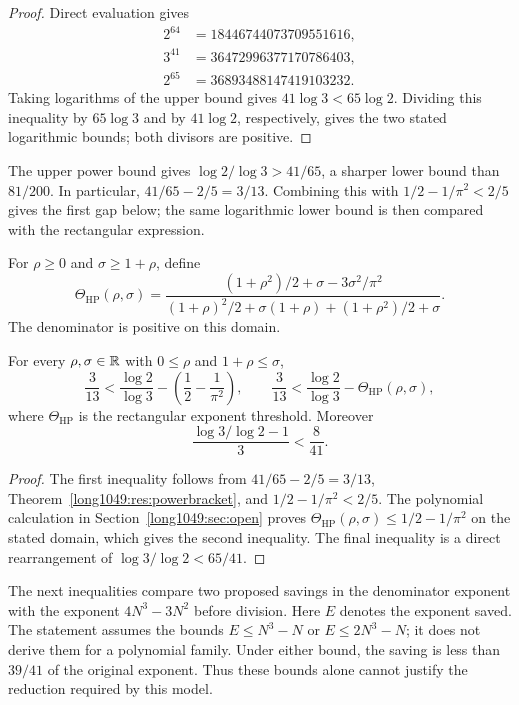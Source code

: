 \documentclass[11pt]{article}
\begin{document}
\begin{proof}
Direct evaluation gives
\[
 \begin{aligned}
 2^{64}&=18446744073709551616,\\
 3^{41}&=36472996377170786403,\\
 2^{65}&=36893488147419103232.
 \end{aligned}
\]
Taking logarithms of the upper bound gives $41\log3<65\log2$.
Dividing this inequality by $65\log3$ and by $41\log2$, respectively,
gives the two stated logarithmic bounds; both divisors are positive.
\end{proof}

The upper power bound gives $\log2/\log3>41/65$, a sharper lower
bound than $81/200$. In particular,
$41/65-2/5=3/13$. Combining this with
$1/2-1/\pi^2<2/5$ gives the first gap below; the same logarithmic
lower bound is then compared with the rectangular expression.

For $\rho\ge0$ and $\sigma\ge1+\rho$, define
\[
 \Theta_{\mathrm{HP}}(\rho,\sigma)=
 \frac{(1+\rho^2)/2+\sigma-3\sigma^2/\pi^2}
 {(1+\rho)^2/2+\sigma(1+\rho)+(1+\rho^2)/2+\sigma}.
\]
The denominator is positive on this domain.

\begin{corollary}\label{long1049:res:sharpgaps}
For every $\rho,\sigma\in\mathbb{R}$ with $0\le\rho$ and $1+\rho\le\sigma$,
\[
 \frac3{13}<\frac{\log2}{\log3}
   -\left(\frac12-\frac1{\pi^2}\right),
 \qquad
 \frac3{13}<\frac{\log2}{\log3}-\Theta_{\mathrm{HP}}(\rho,\sigma),
\]
where $\Theta_{\mathrm{HP}}$ is the rectangular exponent threshold.  Moreover
\[
 \frac{\log3/\log2-1}{3}<\frac8{41}.
\]
\end{corollary}

\begin{proof}
The first inequality follows from
$41/65-2/5=3/13$, Theorem~\ref{long1049:res:powerbracket}, and
$1/2-1/\pi^2<2/5$. The polynomial calculation in
Section~\ref{long1049:sec:open} proves
$\Theta_{\mathrm{HP}}(\rho,\sigma)\le1/2-1/\pi^2$ on the stated
domain, which gives the second inequality.  The final inequality is a direct
rearrangement of $\log3/\log2<65/41$.
\end{proof}

The next inequalities compare two proposed savings in the denominator
exponent with the exponent $4N^3-3N^2$ before division. Here $E$ denotes
the exponent saved. The statement assumes the bounds $E\le N^3-N$ or
$E\le2N^3-N$; it does not derive them for a polynomial family. Under either
bound, the saving is less than $39/41$ of the original exponent. Thus
these bounds alone cannot justify the reduction required by this model.
\end{document}
